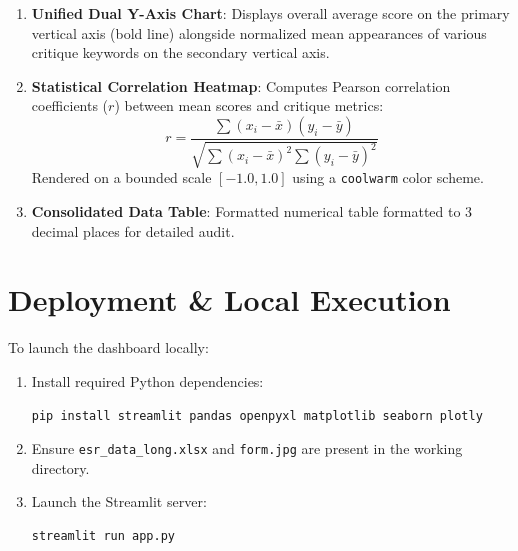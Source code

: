\documentclass[11pt, a4paper]{article}
\begin{document}
\begin{enumerate}
    \item \textbf{Unified Dual Y-Axis Chart}: Displays overall average score on the primary vertical axis (bold line) alongside normalized mean appearances of various critique keywords on the secondary vertical axis.
    \item \textbf{Statistical Correlation Heatmap}: Computes Pearson correlation coefficients ($r$) between mean scores and critique metrics:
    \begin{equation}
    r = \frac{\sum (x_i - \bar{x})(y_i - \bar{y})}{\sqrt{\sum (x_i - \bar{x})^2 \sum (y_i - \bar{y})^2}}
    \end{equation}
    Rendered on a bounded scale $[-1.0, 1.0]$ using a \texttt{coolwarm} color scheme.
    \item \textbf{Consolidated Data Table}: Formatted numerical table formatted to 3 decimal places for detailed audit.
\end{enumerate}

\section{Deployment \& Local Execution}

To launch the dashboard locally:

\begin{enumerate}
    \item Install required Python dependencies:
\begin{lstlisting}[language=bash]
pip install streamlit pandas openpyxl matplotlib seaborn plotly
\end{lstlisting}
    \item Ensure \texttt{esr\_data\_long.xlsx} and \texttt{form.jpg} are present in the working directory.
    \item Launch the Streamlit server:
\begin{lstlisting}[language=bash]
streamlit run app.py
\end{lstlisting}
\end{enumerate}
\end{document}

